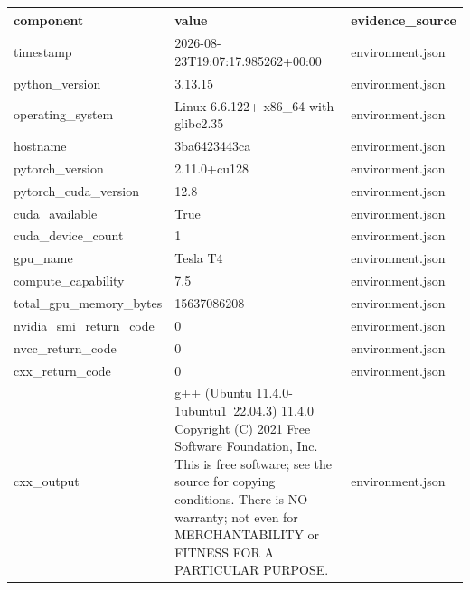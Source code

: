 \begin{tabular}{lll}
\hline
component & value & evidence\_source \\
\hline
timestamp & 2026-08-23T19:07:17.985262+00:00 & environment.json \\
python\_version & 3.13.15 & environment.json \\
operating\_system & Linux-6.6.122+-x86\_64-with-glibc2.35 & environment.json \\
hostname & 3ba6423443ca & environment.json \\
pytorch\_version & 2.11.0+cu128 & environment.json \\
pytorch\_cuda\_version & 12.8 & environment.json \\
cuda\_available & True & environment.json \\
cuda\_device\_count & 1 & environment.json \\
gpu\_name & Tesla T4 & environment.json \\
compute\_capability & 7.5 & environment.json \\
total\_gpu\_memory\_bytes & 15637086208 & environment.json \\
nvidia\_smi\_return\_code & 0 & environment.json \\
nvcc\_return\_code & 0 & environment.json \\
cxx\_return\_code & 0 & environment.json \\
cxx\_output & g++ (Ubuntu 11.4.0-1ubuntu1~22.04.3) 11.4.0
Copyright (C) 2021 Free Software Foundation, Inc.
This is free software; see the source for copying conditions.  There is NO
warranty; not even for MERCHANTABILITY or FITNESS FOR A PARTICULAR PURPOSE.

 & environment.json \\
\hline
\end{tabular}
